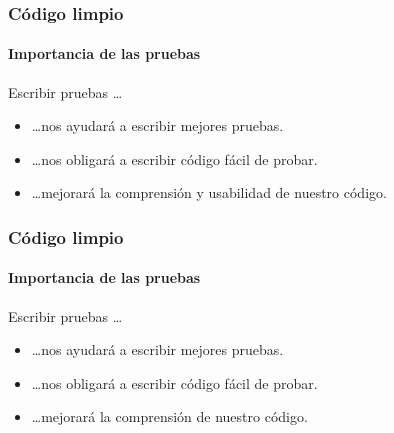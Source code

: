 \begin{frame}
  \frametitle{Código limpio}
  \framesubtitle{Importancia de las pruebas}

  Escribir pruebas \ldots
  \begin{itemize}
  \item \ldots nos ayudará a escribir mejores pruebas.
  \item \ldots nos obligará a escribir código fácil de probar.
  \item \ldots mejorará la comprensión y usabilidad de nuestro código.
  \end{itemize}
\end{frame}

\begin{frame}
  \frametitle{Código limpio}
  \framesubtitle{Importancia de las pruebas}

  Escribir pruebas \ldots
  \begin{itemize}
  \item \ldots nos ayudará a escribir mejores pruebas.
  \item \ldots nos obligará a escribir código fácil de probar.
  \item \ldots mejorará la comprensión de nuestro código.
  \end{itemize}
\end{frame}
